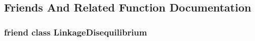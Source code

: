 \subsection{Friends And Related Function Documentation}
\hypertarget{classLinkageOutput_a07cd45779d19a552153e61c58105cbf2}{
\subsubsection[{LinkageDisequilibrium}]{\setlength{\rightskip}{0pt plus 5cm}friend class {\bf LinkageDisequilibrium}}}
\label{classLinkageOutput_a07cd45779d19a552153e61c58105cbf2}


